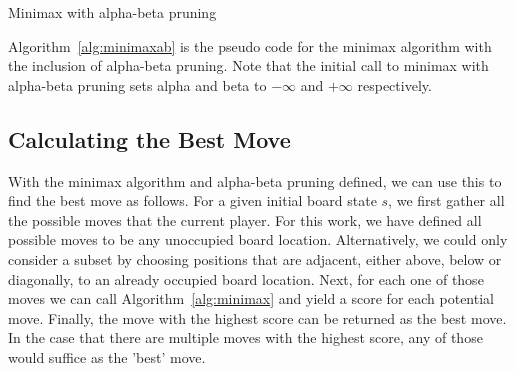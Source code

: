 \begin{algorithm}[!htbp]
\SetAlgoLined
{}

\caption{Minimax with alpha-beta pruning}
\label{alg:minimaxab}
\end{algorithm}

\noindent
Algorithm~\ref{alg:minimaxab} is the pseudo code for the minimax algorithm with the inclusion of alpha-beta pruning. Note that the initial call to minimax with alpha-beta pruning sets alpha and beta to $-\infty$ and $+\infty$ respectively.


\subsection{Calculating the Best Move}
With the minimax algorithm and alpha-beta pruning defined, we can use this to find the best move as follows. For a given initial board state $s$, we first gather all the possible moves that the current player. For this work, we have defined all possible moves to be any unoccupied board location. Alternatively, we could only consider a subset by choosing positions that are adjacent, either above, below or diagonally, to an already occupied board location. Next, for each one of those moves we can call Algorithm~\ref{alg:minimax} and yield a score for each potential move. Finally, the move  with the highest score can be returned as the best move. In the case that there are multiple moves with the highest score, any of those would suffice as the 'best' move. 
